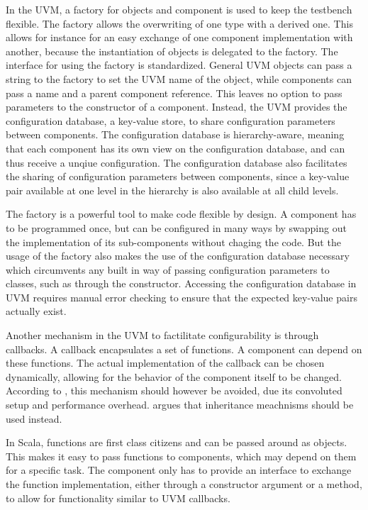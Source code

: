 In the UVM, a factory for objects and component is used to keep the testbench flexible. The factory allows the
overwriting of one type with a derived one. This allows for instance for an easy exchange of one component implementation with
another, because the instantiation of objects is delegated to the factory. The interface for using the factory is
standardized. General UVM objects can pass a string to the factory to set the UVM name of the object, while components can pass a
name and a parent component reference. This leaves no option to pass parameters to the constructor of a component.
Instead, the UVM provides the configuration database, a key-value store, to share configuration parameters between
components. The configuration database is hierarchy-aware, meaning that each component has its own view on the
configuration database, and can thus receive a unqiue configuration. The configuration database also facilitates the
sharing of configuration parameters between components, since a key-value pair available at one level in the
hierarchy is also available at all child levels.

The factory is a powerful tool to make code flexible by design. A component has to be programmed once, but can be
configured in many ways by swapping out the implementation of its sub-components without chaging the code. But the
usage of the factory also makes the use of the configuration database necessary which circumvents any built in way of
passing configuration parameters to classes, such as through the constructor. Accessing the configuration database in UVM
requires manual error checking to ensure that the expected key-value pairs actually exist.

Another mechanism in the UVM to factilitate configurability is through callbacks. A callback encapsulates a set of
functions. A component can depend on these functions. The actual implementation of the callback can be chosen
dynamically, allowing for the behavior of the component itself to be changed. According to
\citeauthor{sutherland2015uvm} \cite{sutherland2015uvm}, this mechanism should however be avoided, due its convoluted
setup and performance overhead. \citeauthor{sutherland2015uvm} argues that inheritance meachnisms should be used instead.

In Scala, functions are first class citizens and can be passed around as objects. This makes it easy to pass
functions to components, which may depend on them for a specific task. The component only has to provide an interface to
exchange the function implementation, either through a constructor argument or a method, to allow for functionality similar to UVM callbacks.

